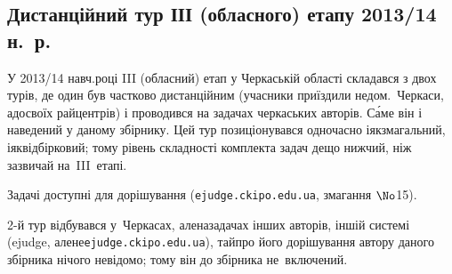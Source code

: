 \renewenvironment{problemAllDefault}[1]{\vspace{10mm}\par\begin{problem}{#1}{Клавіатура (stdin)}{Екран (stdout)}{1 сек}{64 мегабайти}}{\end{problem}}


\subsection{Дистанційний тур ІІІ (обласного) етапу 2013/14 н.~р.}

У 2013/14 навч.\nolinebreak[3] році III (обласний) етап у Черкаській області складався з двох турів, де один був частково дистанційним (учасники приїздили не\nolinebreak[3] до\nolinebreak[3] м.~Черкаси, а\nolinebreak[3] до\nolinebreak[3] своїх райцентрів) і проводився на задачах черкаських авторів. С\'{а}ме він і наведений у даному збірнику. Цей тур позиціонувався одночасно і\nolinebreak[2] як\nolinebreak[2] змагальний, і\nolinebreak[2] як\nolinebreak[2] відбірковий; тому рівень складності комплекта задач дещо нижчий, ніж зазвичай на~III~етапі.

Задачі доступні для дорішування (\verb"ejudge.ckipo.edu.ua", змагання $\No$15). 

2-й тур відбувався у~Черкасах, але\nolinebreak[2] на\nolinebreak[2] задачах інших авторів, іншій системі (ejudge, але\nolinebreak[2] не\nolinebreak[2] \verb"ejudge.ckipo.edu.ua"), та\nolinebreak[3] й\nolinebreak[3] про його дорішування автору даного збірника нічого не\nolinebreak[3] відомо; тому він до збірника не~включений.


\vspace{-0.5\baselineskip minus 1cm}
	

	

	

	


